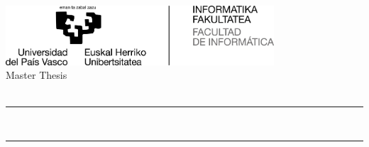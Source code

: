\thispagestyle{empty}

\newcommand{\HRule}{\rule{\linewidth}{0.5mm}} 

\thispagestyle{empty}
\begin{center}
	
  \includegraphics[width=0.75\textwidth]{config/logo.jpg} \\[2cm]
  
  
  {\LARGE {Master Thesis}\\[0.5cm]
  {\Large \ikasketak}}\\[2cm]
  
  
  \HRule \\[0.5cm]
  {\LARGE 
    \textbf{\izenburua}
  }
  \HRule \\[0.5cm]

  \Large \textsl{\egilea}\\
  
   
  \vfill
  
  \textbf{\zuzendariaktestua}\\
  \zuzendariak\\[2cm]
  
  \data

\end{center}
